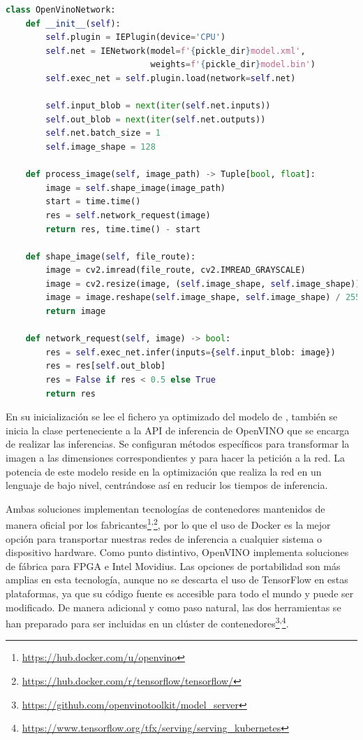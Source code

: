\begin{lstlisting}[caption=Código Python para la red de inferencia de OpenVINO.,
    label=a_label,
    language=Python,label={example}]
    class OpenVinoNetwork:
    def __init__(self):
        self.plugin = IEPlugin(device='CPU')
        self.net = IENetwork(model=f'{pickle_dir}model.xml',
                             weights=f'{pickle_dir}model.bin')
        self.exec_net = self.plugin.load(network=self.net)

        self.input_blob = next(iter(self.net.inputs))
        self.out_blob = next(iter(self.net.outputs))
        self.net.batch_size = 1
        self.image_shape = 128

    def process_image(self, image_path) -> Tuple[bool, float]:
        image = self.shape_image(image_path)
        start = time.time()
        res = self.network_request(image)
        return res, time.time() - start

    def shape_image(self, file_route):
        image = cv2.imread(file_route, cv2.IMREAD_GRAYSCALE)
        image = cv2.resize(image, (self.image_shape, self.image_shape))
        image = image.reshape(self.image_shape, self.image_shape) / 255.0
        return image

    def network_request(self, image) -> bool:
        res = self.exec_net.infer(inputs={self.input_blob: image})
        res = res[self.out_blob]
        res = False if res < 0.5 else True
        return res
\end{lstlisting}

En su inicialización se lee el fichero ya optimizado del modelo de , también se inicia la clase
perteneciente a la API de inferencia de OpenVINO que se encarga de realizar las inferencias.
Se configuran métodos específicos para transformar la imagen a las dimensiones correspondientes y para hacer la petición a la red.
La potencia de este modelo reside en la optimización que realiza la red en un lenguaje de bajo nivel, centrándose así en reducir los tiempos de inferencia.

Ambas soluciones implementan tecnologías de contenedores mantenidos de manera oficial por los fabricantes\footnote{\url{https://hub.docker.com/u/openvino}}\textsuperscript{,}\footnote{\url{https://hub.docker.com/r/tensorflow/tensorflow/}}, por lo que el uso de Docker es la mejor opción para transportar
nuestras redes de inferencia a cualquier sistema o dispositivo hardware.
Como punto distintivo, OpenVINO implementa soluciones de fábrica para FPGA e Intel Movidius. Las opciones de portabilidad son más amplias en esta tecnología, aunque no se descarta el uso de TensorFlow en estas plataformas, ya que su código fuente es accesible para todo el mundo y puede ser modificado.
De manera adicional y como paso natural, las dos herramientas se han preparado para ser incluidas en un clúster de contenedores\footnote{\url{https://github.com/openvinotoolkit/model_server}}\textsuperscript{,}\footnote{\url{https://www.tensorflow.org/tfx/serving/serving_kubernetes}}.



